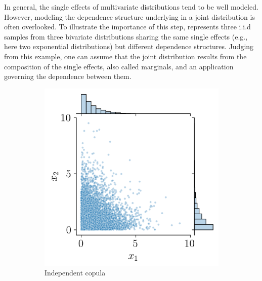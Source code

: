 In general, the single effects of multivariate distributions tend to be well modeled. 
However, modeling the dependence structure underlying in a joint distribution is often overlooked.  
To illustrate the importance of this step,  represents three i.i.d samples from three bivariate distributions sharing the same single effects (e.g., here two exponential distributions) but different dependence structures. 
Judging from this example, one can assume that the joint distribution results from the composition of the single effects, also called marginals, and an application governing the dependence between them. 
\begin{figure}[ht]
    \centering
    \begin{subfigure}[b]{0.32\textwidth}
        \centering
        \includegraphics[width=\textwidth]{../numerical_experiments/chapter1/figures/independent_copula.png}
        \caption{Independent copula}
    \end{subfigure}
    \hfill
    \begin{subfigure}[b]{0.32\textwidth}
        \centering

\end{subfigure}
\end{figure}
